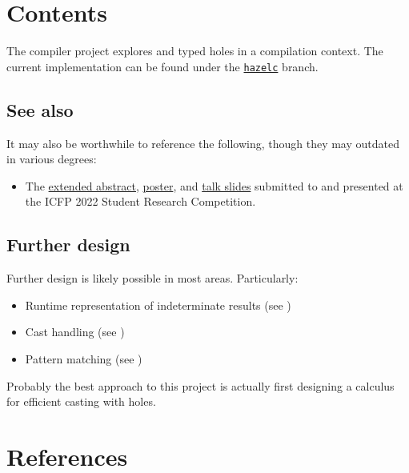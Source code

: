 \documentclass{report}
\begin{document}
\setcounter{chapter}{13}

\section{Contents}
The compiler project explores \Hazel{} and typed holes in a compilation context. The
current implementation can be found under the
\href{https://github.com/hazelgrove/hazel/tree/hazelc}{\texttt{hazelc}} branch. 

\tableofcontents

\subsection{See also}
\label{sec:see-also}
It may also be worthwhile to reference the following, though they may outdated in various degrees:
%
\begin{itemize}
  \item The \href{https://github.com/hazelgrove/hazelc-icfp22-src}{extended abstract},
    \href{https://github.com/mirryi/hazelc-icfp22-poster}{poster}, and
    \href{https://github.com/mirryi/hazelc-icfp22-slides}{talk slides} submitted to and presented at
    the ICFP 2022 Student Research Competition.
\end{itemize}

\subsection{Further design}
\label{sec:further-design}
Further design is likely possible in most areas. Particularly:
\begin{itemize}
  \item Runtime representation of indeterminate results (see )
  \item Cast handling (see )
  \item Pattern matching (see )
\end{itemize}
%
Probably the best approach to this project is actually first designing a calculus for efficient
casting with holes.






\section{References}
\printbibliography[heading=none]
\end{document}
